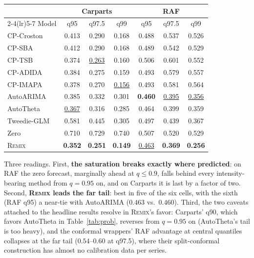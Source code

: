 \documentclass[twocolumn,10pt]{article}
\newcommand{\REMIX}{\textsc{Remix}}
\newcommand{\best}[1]{\textbf{#1}}
\newcommand{\secondbest}[1]{\underline{#1}}
\begin{document}
\begin{table}[h]
\centering
\small
\setlength{\tabcolsep}{3.6pt}
\begin{tabular}{lccc@{\hspace{10pt}}ccc}
\toprule
 & \multicolumn{3}{c}{Carparts} & \multicolumn{3}{c}{RAF}\\
\cmidrule(lr){2-4}\cmidrule(lr){5-7}
Model & q95 & q97.5 & q99 & q95 & q97.5 & q99\\
\midrule
CP-Croston & 0.413 & 0.290 & 0.168 & 0.488 & 0.537 & 0.526\\
CP-SBA & 0.412 & 0.290 & 0.168 & 0.489 & 0.542 & 0.529\\
CP-TSB & 0.374 & \secondbest{0.263} & 0.160 & 0.506 & 0.601 & 0.552\\
CP-ADIDA & 0.384 & 0.275 & 0.159 & 0.493 & 0.579 & 0.557\\
CP-IMAPA & 0.378 & 0.270 & \secondbest{0.156} & 0.493 & 0.581 & 0.564\\
AutoARIMA & 0.385 & 0.332 & 0.301 & \best{0.460} & \secondbest{0.395} & \secondbest{0.356}\\
AutoTheta & \secondbest{0.367} & 0.316 & 0.285 & 0.464 & 0.399 & 0.359\\
Tweedie-GLM & 0.581 & 0.445 & 0.305 & 0.497 & 0.439 & 0.367\\
\midrule
Zero & 0.710 & 0.729 & 0.740 & 0.507 & 0.520 & 0.529\\
\midrule
\REMIX{} & \best{0.352} & \best{0.251} & \best{0.149} & \secondbest{0.463} & \best{0.369} & \best{0.256}\\
\bottomrule
\end{tabular}
\end{table}

Three readings. First, \textbf{the saturation breaks exactly where
predicted}: on RAF the zero forecast, marginally ahead at $q\le0.9$,
falls behind every intensity-bearing method from $q{=}0.95$ on, and on
Carparts it is last by a factor of two. Second, \textbf{\REMIX{} leads
the far tail}: best in five of the six cells, with the sixth (RAF q95)
a near-tie with AutoARIMA ($0.463$ vs.\ $0.460$). Third, the two
caveats attached to the headline results resolve in \REMIX{}'s favor:
Carparts' q90, which favors AutoTheta in Table~\ref{tab:prob}, reverses
from $q{=}0.95$ on (AutoTheta's tail is too heavy), and the conformal
wrappers' RAF advantage at central quantiles collapses at the far tail
($0.54$--$0.60$ at q97.5), where their split-conformal construction has
almost no calibration data per series.
\end{document}
